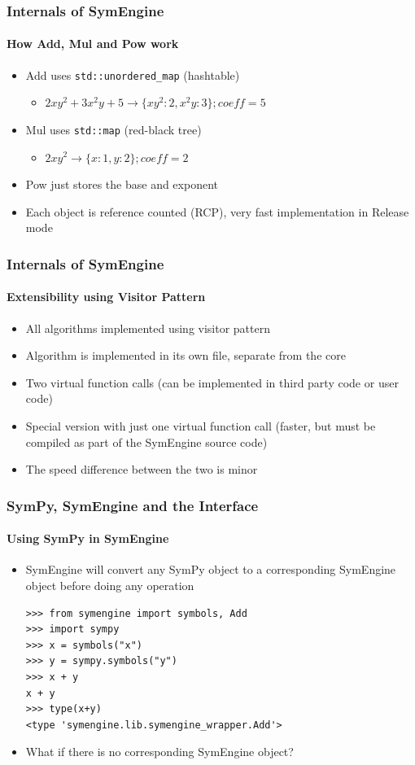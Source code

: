\documentclass{beamer}
\begin{document}
\begin{frame}
\frametitle{Internals of SymEngine}
\framesubtitle{How Add, Mul and Pow work}
\begin{itemize}
    \item Add uses \texttt{std::unordered\_map} (hashtable)
        \begin{itemize}
            \item $2xy^2+3x^2y + 5\to \{xy^2: 2, x^2y: 3\}; coeff=5 $
        \end{itemize}
    \item Mul uses \texttt{std::map} (red-black tree)
        \begin{itemize}
            \item $2 xy^2 \to \{x: 1, y:2\}; coeff=2$
        \end{itemize}
    \item Pow just stores the base and exponent
    \item Each object is reference counted (RCP), very fast implementation in
        Release mode
\end{itemize}
\end{frame}


\begin{frame}
\frametitle{Internals of SymEngine}
\framesubtitle{Extensibility using Visitor Pattern}
\begin{itemize}
    \item All algorithms implemented using visitor pattern
    \item Algorithm is implemented in its own file, separate from the core
    \item Two virtual function calls (can be implemented in third party code or
        user code)
    \item Special version with just one virtual function call (faster, but must
        be compiled as part of the SymEngine source code)
    \item The speed difference between the two is minor
\end{itemize}
\end{frame}


\begin{frame}[fragile]
\frametitle{SymPy, SymEngine and the Interface}
\framesubtitle{Using SymPy in SymEngine}
\begin{itemize}
\item
SymEngine will convert any SymPy object to a corresponding SymEngine object before doing any operation

\begin{verbatim}
>>> from symengine import symbols, Add
>>> import sympy
>>> x = symbols("x")
>>> y = sympy.symbols("y")
>>> x + y
x + y
>>> type(x+y)
<type 'symengine.lib.symengine_wrapper.Add'>
\end{verbatim}
\item
What if there is no corresponding SymEngine object?
\end{itemize}
\end{frame}
\end{document}
